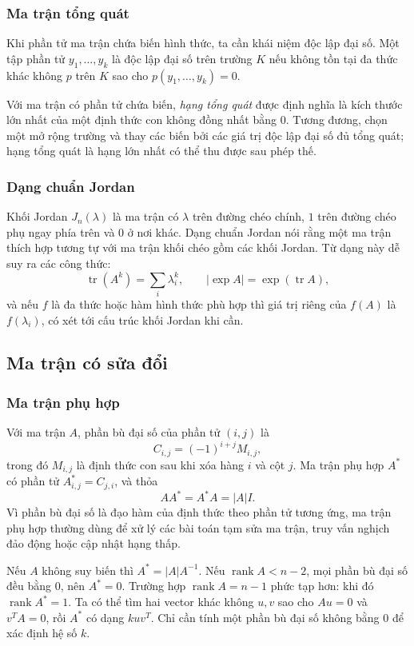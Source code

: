 \documentclass[11pt]{article}
\begin{document}
\subsubsection{Ma trận tổng quát}

Khi phần tử ma trận chứa biến hình thức, ta cần khái niệm độc lập đại số. Một
tập phần tử $y_1,\ldots,y_k$ là độc lập đại số trên trường $K$ nếu không tồn tại
đa thức khác không $p$ trên $K$ sao cho $p(y_1,\ldots,y_k)=0$.

Với ma trận có phần tử chứa biến, \emph{hạng tổng quát} được định nghĩa là kích
thước lớn nhất của một định thức con không đồng nhất bằng $0$. Tương đương, chọn
một mở rộng trường và thay các biến bởi các giá trị độc lập đại số đủ tổng quát;
hạng tổng quát là hạng lớn nhất có thể thu được sau phép thế.

\subsubsection{Dạng chuẩn Jordan}

Khối Jordan $J_n(\lambda)$ là ma trận có $\lambda$ trên đường chéo chính, $1$
trên đường chéo phụ ngay phía trên và $0$ ở nơi khác. Dạng chuẩn Jordan nói rằng
một ma trận thích hợp tương tự với ma trận khối chéo gồm các khối Jordan. Từ dạng
này dễ suy ra các công thức:
\[
  \operatorname{tr}(A^k)=\sum_i \lambda_i^k,\qquad
  |\exp A|=\exp(\operatorname{tr}A),
\]
và nếu $f$ là đa thức hoặc hàm hình thức phù hợp thì giá trị riêng của $f(A)$ là
$f(\lambda_i)$, có xét tới cấu trúc khối Jordan khi cần.

\subsection{Ma trận có sửa đổi}

\subsubsection{Ma trận phụ hợp}

Với ma trận $A$, phần bù đại số của phần tử $(i,j)$ là
\[
  C_{i,j}=(-1)^{i+j}M_{i,j},
\]
trong đó $M_{i,j}$ là định thức con sau khi xóa hàng $i$ và cột $j$. Ma trận
phụ hợp $A^*$ có phần tử $A^*_{i,j}=C_{j,i}$, và thỏa
\[
  AA^*=A^*A=|A|I.
\]
Vì phần bù đại số là đạo hàm của định thức theo phần tử tương ứng, ma trận phụ
hợp thường dùng để xử lý các bài toán tạm sửa ma trận, truy vấn nghịch đảo động
hoặc cập nhật hạng thấp.

Nếu $A$ không suy biến thì $A^*=|A|A^{-1}$. Nếu
$\operatorname{rank}A<n-2$, mọi phần bù đại số đều bằng $0$, nên $A^*=0$. Trường
hợp $\operatorname{rank}A=n-1$ phức tạp hơn: khi đó $\operatorname{rank}A^*=1$.
Ta có thể tìm hai vector khác không $u,v$ sao cho $Au=0$ và $v^TA=0$, rồi
$A^*$ có dạng $kuv^T$. Chỉ cần tính một phần bù đại số không bằng $0$ để xác
định hệ số $k$.
\end{document}
